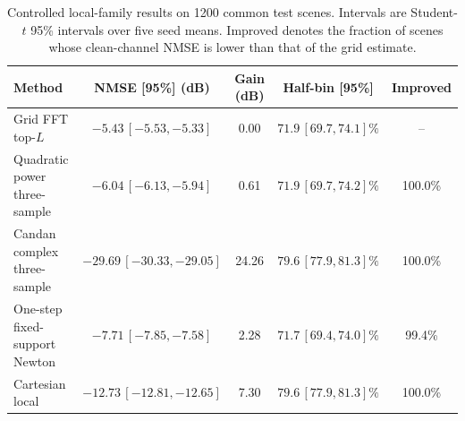 \begin{table}[!ht]
\centering
\caption{Controlled local-family results on 1200 common test scenes. Intervals are Student-$t$ 95\% intervals over five seed means. Improved denotes the fraction of scenes whose clean-channel NMSE is lower than that of the grid estimate.}
\label{tab:supp_local_family}
\scriptsize
\setlength{\tabcolsep}{3.0pt}
\begin{tabular}{lcccc}
\toprule
Method & NMSE [95\%] (dB) & Gain (dB) & Half-bin [95\%] & Improved \\
\midrule
Grid FFT top-$L$ & $-5.43\,[-5.53,-5.33]$ & 0.00 & $71.9\,[69.7,74.1]\%$ & -- \\
Quadratic power three-sample & $-6.04\,[-6.13,-5.94]$ & 0.61 & $71.9\,[69.7,74.2]\%$ & 100.0\% \\
Candan complex three-sample & $-29.69\,[-30.33,-29.05]$ & 24.26 & $79.6\,[77.9,81.3]\%$ & 100.0\% \\
One-step fixed-support Newton & $-7.71\,[-7.85,-7.58]$ & 2.28 & $71.7\,[69.4,74.0]\%$ & 99.4\% \\
Cartesian local & $-12.73\,[-12.81,-12.65]$ & 7.30 & $79.6\,[77.9,81.3]\%$ & 100.0\% \\
\bottomrule
\end{tabular}
\end{table}
